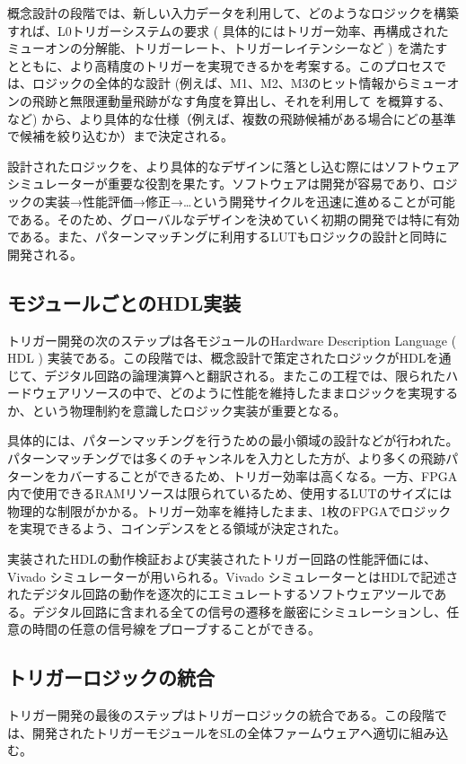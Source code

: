 概念設計の段階では、新しい入力データを利用して、どのようなロジックを構築すれば、L0トリガーシステムの要求 ( 具体的にはトリガー効率、再構成されたミューオンの\pt 分解能、トリガーレート、トリガーレイテンシーなど ) を満たすとともに、より高精度のトリガーを実現できるかを考案する。このプロセスでは、ロジックの全体的な設計 (例えば、M1、M2、M3のヒット情報からミューオンの飛跡と無限運動量飛跡がなす角度を算出し、それを利用して \pt を概算する、など) から、より具体的な仕様（例えば、複数の飛跡候補がある場合にどの基準で候補を絞り込むか）まで決定される。

設計されたロジックを、より具体的なデザインに落とし込む際にはソフトウェアシミュレーターが重要な役割を果たす。ソフトウェアは開発が容易であり、ロジックの実装→性能評価→修正→…という開発サイクルを迅速に進めることが可能である。そのため、グローバルなデザインを決めていく初期の開発では特に有効である。また、パターンマッチングに利用するLUTもロジックの設計と同時に開発される。

\subsection*{モジュールごとのHDL実装}
トリガー開発の次のステップは各モジュールのHardware Description Language ( HDL ) 実装である。この段階では、概念設計で策定されたロジックがHDLを通じて、デジタル回路の論理演算へと翻訳される。またこの工程では、限られたハードウェアリソースの中で、どのように性能を維持したままロジックを実現するか、という物理制約を意識したロジック実装が重要となる。

具体的には、パターンマッチングを行うための最小領域の設計などが行われた。パターンマッチングでは多くのチャンネルを入力とした方が、より多くの飛跡パターンをカバーすることができるため、トリガー効率は高くなる。一方、FPGA内で使用できるRAMリソースは限られているため、使用するLUTのサイズには物理的な制限がかかる。トリガー効率を維持したまま、1枚のFPGAでロジックを実現できるよう、コインデンスをとる領域が決定された。

実装されたHDLの動作検証および実装されたトリガー回路の性能評価には、Vivado シミュレーターが用いられる。Vivado シミュレーターとはHDLで記述されたデジタル回路の動作を逐次的にエミュレートするソフトウェアツールである。デジタル回路に含まれる全ての信号の遷移を厳密にシミュレーションし、任意の時間の任意の信号線をプローブすることができる。

\subsection*{トリガーロジックの統合}
トリガー開発の最後のステップはトリガーロジックの統合である。この段階では、開発されたトリガーモジュールをSLの全体ファームウェアへ適切に組み込む。

